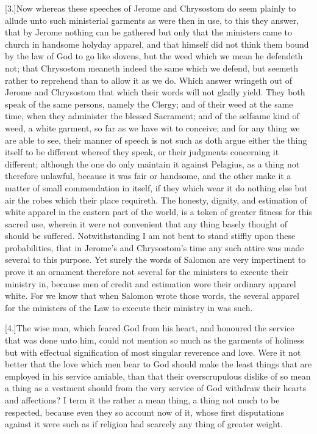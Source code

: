 [3.]Now whereas these speeches of Jerome and Chrysostom do seem plainly to allude unto such ministerial garments as were then in use, to this they answer, that by Jerome nothing can be gathered but only that the ministers came to church in handsome holyday apparel, and that himself did not think them bound by the law of God to go like slovens, but the weed which we mean he defendeth not; that Chrysostom meaneth indeed the same which we defend, but seemeth rather to reprehend than to allow it as we do. Which answer wringeth out of Jerome and Chrysostom that which their words will not gladly yield. They both speak of the same persons, namely the Clergy; and of their weed at the same time, when they administer the blessed Sacrament; and of the selfsame kind of weed, a white garment, so far as we have wit to conceive; and for any thing we are able to see, their manner of speech is not such as doth argue either the thing itself to be different whereof they speak, or their judgments  concerning it different;
 although the one do only maintain it against Pelagius, as a thing not therefore unlawful, because it was fair or handsome, and the other make it a matter of small commendation in itself, if they which wear it do nothing else but air the robes which their place requireth. The honesty, dignity, and estimation of white apparel in the eastern part of the world, is a token of greater fitness for this sacred use, wherein it were not convenient that any thing basely thought of should be suffered. Notwithstanding I am not bent to stand stiffly upon these probabilities, that in Jerome’s and Chrysostom’s time any such attire was made several to this purpose. Yet surely the words of Salomon are very impertinent to prove it an ornament therefore not several for the ministers to execute their ministry in, because men of credit and estimation wore their ordinary apparel white. For we know that when Salomon wrote those words, the several apparel for the ministers of the Law to execute their ministry in was such.

[4.]The wise man, which feared God from his heart, and honoured the service that was done unto him, could not mention so much as the garments of holiness but with effectual signification of most singular reverence and love. Were it not better that the love which men bear to God should make the least things that are employed in his service amiable, than that their overscrupulous dislike of so mean a thing as a vestment should from the very service of God withdraw their hearts and affections? I term it the rather a mean thing, a thing not much to be respected, because even they so account now of it, whose first disputations against it were such as if religion had scarcely any thing of greater weight.

